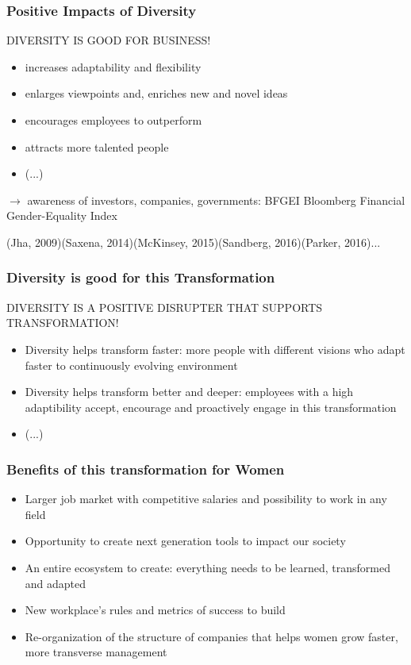 \begin{frame}
\frametitle{Positive Impacts of Diversity}
\vskip 0.7cm
\textcolor{isvblue}{DIVERSITY IS GOOD FOR BUSINESS!}
\begin{itemize}
\item increases \textcolor{isvblue}{adaptability} and \textcolor{isvblue}{flexibility}
\item enlarges \textcolor{isvblue}{viewpoints} and, enriches \textcolor{isvblue}{new} and \textcolor{isvblue}{novel ideas}
\item encourages employees to \textcolor{isvblue}{outperform}
\item attracts more \textcolor{isvblue}{talented people}
\item (...)
\end{itemize}

\vskip 0.2cm
$\rightarrow$ awareness of investors, companies, governments:  BFGEI Bloomberg Financial Gender-Equality Index

\vskip 0.4cm
\tiny{(Jha, 2009)(Saxena, 2014)(McKinsey, 2015)(Sandberg, 2016)(Parker, 2016)...}
\end{frame}

\begin{frame}
\frametitle{Diversity is good for this Transformation}
\vskip 0.7cm
\textcolor{isvblue}{DIVERSITY IS A POSITIVE DISRUPTER THAT SUPPORTS TRANSFORMATION!}
\begin{itemize}
\item \textcolor{isvblue}{Diversity helps transform faster}: more people with different visions who adapt faster to continuously evolving environment
\item \textcolor{isvblue}{Diversity helps transform better and deeper}: employees with a high adaptibility accept, encourage and proactively engage in this transformation
\item (...)
\end{itemize}
\end{frame}

\begin{frame}
\frametitle{Benefits of this transformation for Women}
\vskip 0.4cm
\begin{itemize}
\item \textcolor{isvblue}{Larger job market with competitive salaries} and possibility to work in any field 
\item Opportunity to \textcolor{isvblue}{create next generation tools} to \textcolor{isvblue}{impact our society} 
\item An \textcolor{isvblue}{entire ecosystem to create}: everything needs to be learned, transformed and adapted
\item \textcolor{isvblue}{New workplace's rules and metrics of success} to build
\item \textcolor{isvblue}{Re-organization of the structure of companies} that helps women grow faster, more transverse management
\end{itemize}

\end{frame}
